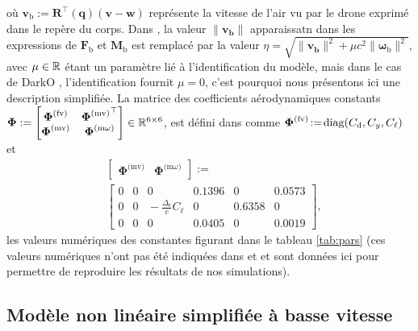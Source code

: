 où $\boldsymbol{v}_{\text{b}} := \boldsymbol{R}^\top(\boldsymbol{q}) (\boldsymbol{v}-\boldsymbol{w})$ représente la vitesse de l'air vu par le drone exprimé dans le repère du corps. Dans \cite{lustosaHal-03035938}, la valeur $\lVert \boldsymbol{v_{\text{b}}} \rVert$ apparaissatn dans les expressions de  $\boldsymbol{F}_{\text{b}}$ et $\boldsymbol{M}_{\text{b}}$ est remplacé par la valeur $\eta = \sqrt{\lVert \boldsymbol{v_{\text{b}}} \rVert^{2} + \mu c^{2} \lVert \boldsymbol{\omega}_{\text{b}} \rVert^{2}}$, avec $\mu \in {\mathbb R}$ étant un paramètre lié à l'identification du modèle, mais dans le cas de DarkO \cite{sansouStage}, l'identification fournit $\mu = 0$, c'est pourquoi nous présentons ici une description simplifiée. La matrice des coefficients aérodynamiques constants 
$\boldsymbol{\Phi}:= \begin{bmatrix} \boldsymbol{\Phi}^{\text{(fv)}} & {\boldsymbol{\Phi}^{\text{(mv)}}}^\top \\ \boldsymbol{\Phi}^{\text{(mv)}} & \boldsymbol{\Phi}^{\text{(m$\omega$)}} \end{bmatrix} \in {\mathbb R}^{6 \times 6}$, est défini dans \cite[eqs. (6)--(9)]{olszaneckibarthHal-02542982} comme $ \boldsymbol{\Phi}^{\text{(fv)}} \!:=\! \operatorname{diag}(C_{\text{d}},C_{y}, C_{\ell})$ et
\begin{align*}
&\left[ \begin{array}{c|c}
    \boldsymbol{\Phi}^{\text{(mv)}}  &  \boldsymbol{\Phi}^{\text{(m$\omega$)}} 
\end{array}\right] :=\\ 
&\left[ \begin{array}{ccc|ccc}
    0 & 0 & 0    &                                          0.1396 & 0 & 0.0573 \\
    0 & 0 & \!\!\!\!\! -\frac{\Delta_{\text{r}}}{c}C_{\ell} &    0 &  0.6358  & 0 \\
    0 & 0 & 0 &     0.0405 & 0 & 0.0019 
\end{array}\right],
\end{align*}
les valeurs numériques des constantes figurant dans le tableau \ref{tab:pars} (ces valeurs numériques n'ont pas été indiquées dans \cite{lustosaHal-03035938} et \cite{olszaneckibarthHal-02542982} et sont données ici pour permettre de reproduire les résultats de nos simulations). 


\subsection{Modèle non linéaire simplifiée à basse vitesse}
\label{sec:model_NL_simp}


